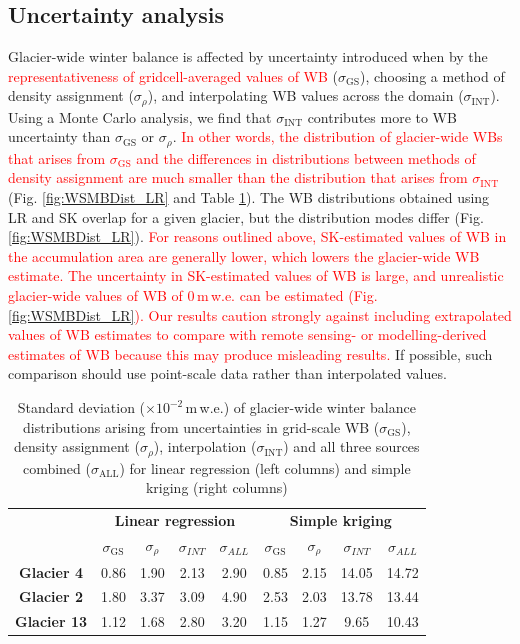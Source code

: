 \documentclass[twocolumn, letterpaper]{igs}
\begin{document}
\subsection{Uncertainty analysis}

Glacier-wide winter balance is affected by uncertainty introduced when by the \textcolor{red}{representativeness of gridcell-averaged values of WB} ($\sigma_{\mathrm{GS}}$), choosing a method of density assignment ($\sigma_{\rho}$), and interpolating WB values across the domain ($\sigma_{\mathrm{INT}}$). Using a Monte Carlo analysis, we find that $\sigma_{\mathrm{INT}}$ contributes more to WB uncertainty than $\sigma_{\mathrm{GS}}$ or $\sigma_{\rho}$. \textcolor{red}{In other words, the distribution of glacier-wide WBs that arises from $\sigma_{\mathrm{GS}}$ and the differences in distributions between methods of density assignment are much smaller than the distribution that arises from $\sigma_{\mathrm{INT}}$} (Fig. \ref{fig:WSMBDist_LR} and Table \ref{tab:WSMBdistribution_sigma}). The WB distributions obtained using LR and SK overlap for a given glacier, but the distribution modes differ (Fig. \ref{fig:WSMBDist_LR}). \textcolor{red}{For reasons outlined above, SK-estimated values of WB in the accumulation area are generally lower, which lowers the glacier-wide WB estimate.  The uncertainty in SK-estimated values of WB is large, and unrealistic glacier-wide values of WB of 0\,m\,w.e. can be estimated (Fig. \ref{fig:WSMBDist_LR}). Our results caution strongly against including extrapolated values of WB estimates to compare with remote sensing- or modelling-derived estimates of WB because this may produce misleading results.} If possible, such comparison should use point-scale data rather than interpolated values. 

 \begin{table}[]
\centering
\caption{Standard deviation ($\times10^{-2}$\,m\,w.e.) of glacier-wide winter balance distributions arising from uncertainties in grid-scale WB ($\sigma_{\mathrm{GS}}$), density assignment ($\sigma_{\rho}$), interpolation ($\sigma_{\mathrm{INT}}$) and all three sources combined ($\sigma_{\mathrm{ALL}}$) for linear regression (left columns) and simple kriging (right columns)}
\label{tab:WSMBdistribution_sigma}
\begin{tabular}{c|cccc|cccc}
 & \multicolumn{4}{c|}{\textbf{Linear regression}} & \multicolumn{4}{c}{\textbf{Simple kriging}} \\
\textbf{} & $\sigma_{\mathrm{GS}}$ & $\sigma_{\rho}$ & $\sigma_{INT}$ & $\sigma_{ALL}$ & $\sigma_{\mathrm{GS}}$ & $\sigma_{\rho}$ & $\sigma_{INT}$ & $\sigma_{ALL}$ \\ \hline
\textbf{Glacier 4} & 0.86 & 1.90 & 2.13 & 2.90 & 0.85 & 2.15 & 14.05 & 14.72 \\
\textbf{Glacier 2} & 1.80 & 3.37 & 3.09 & 4.90 & 2.53 & 2.03 & 13.78 & 13.44 \\
\textbf{Glacier 13} & 1.12 & 1.68 & 2.80 & 3.20 & 1.15 & 1.27 & 9.65 & 10.43
\end{tabular}
\end{table}
\end{document}

